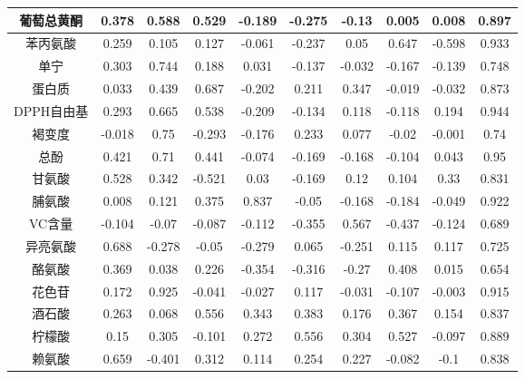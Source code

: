 \documentclass[UTF8]{ctexart}
\begin{document}
\begin{table}[!ht]
{{\begin{tabular}{|c|c|c|c|c|c|c|c|c|c|}
				葡萄总黄酮     & 0.378   & 0.588   & 0.529   & -0.189  & -0.275  & -0.13   & 0.005   & 0.008   & 0.897                \\ \hline
				苯丙氨酸       & 0.259   & 0.105   & 0.127   & -0.061  & -0.237  & 0.05    & 0.647   & -0.598  & 0.933                \\ \hline
				单宁           & 0.303   & 0.744   & 0.188   & 0.031   & -0.137  & -0.032  & -0.167  & -0.139  & 0.748                \\ \hline
				蛋白质         & 0.033   & 0.439   & 0.687   & -0.202  & 0.211   & 0.347   & -0.019  & -0.032  & 0.873                \\ \hline
				DPPH自由基     & 0.293   & 0.665   & 0.538   & -0.209  & -0.134  & 0.118   & -0.118  & 0.194   & 0.944                \\ \hline
				褐变度         & -0.018  & 0.75    & -0.293  & -0.176  & 0.233   & 0.077   & -0.02   & -0.001  & 0.74                 \\ \hline
				总酚           & 0.421   & 0.71    & 0.441   & -0.074  & -0.169  & -0.168  & -0.104  & 0.043   & 0.95                 \\ \hline
				甘氨酸         & 0.528   & 0.342   & -0.521  & 0.03    & -0.169  & 0.12    & 0.104   & 0.33    & 0.831                \\ \hline
				脯氨酸         & 0.008   & 0.121   & 0.375   & 0.837   & -0.05   & -0.168  & -0.184  & -0.049  & 0.922                \\ \hline
				VC含量         & -0.104  & -0.07   & -0.087  & -0.112  & -0.355  & 0.567   & -0.437  & -0.124  & 0.689                \\ \hline
				异亮氨酸       & 0.688   & -0.278  & -0.05   & -0.279  & 0.065   & -0.251  & 0.115   & 0.117   & 0.725                \\ \hline
				酪氨酸         & 0.369   & 0.038   & 0.226   & -0.354  & -0.316  & -0.27   & 0.408   & 0.015   & 0.654                \\ \hline
				花色苷         & 0.172   & 0.925   & -0.041  & -0.027  & 0.117   & -0.031  & -0.107  & -0.003  & 0.915                \\ \hline
				酒石酸         & 0.263   & 0.068   & 0.556   & 0.343   & 0.383   & 0.176   & 0.367   & 0.154   & 0.837                \\ \hline
				柠檬酸         & 0.15    & 0.305   & -0.101  & 0.272   & 0.556   & 0.304   & 0.527   & -0.097  & 0.889                \\ \hline
				赖氨酸         & 0.659   & -0.401  & 0.312   & 0.114   & 0.254   & 0.227   & -0.082  & -0.1    & 0.838                \\ \hline

\end{tabular}}}
\end{table}
\end{document}
